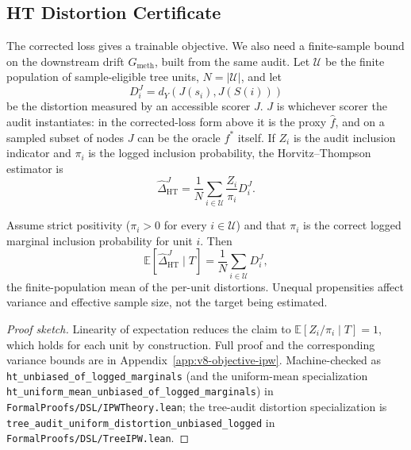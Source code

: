 \subsection{HT Distortion Certificate}

The corrected loss gives a trainable objective. We also need a
finite-sample bound on the downstream drift \(G_{\mathrm{meth}}\),
built from the same audit. Let \(\mathcal U\) be the finite
population of sample-eligible tree units, \(N=|\mathcal U|\),
and let
\[
  D_i^J
  =
  d_Y\!\left(J(s_i),J(S(i))\right)
\]
be the distortion measured by an accessible scorer \(J\). \(J\) is
whichever scorer the audit instantiates: in the corrected-loss form
above it is the proxy \(\widehat f\), and on a sampled subset of nodes
\(J\) can be the oracle \(f^\ast\) itself. If \(Z_i\) is the audit
inclusion indicator and \(\pi_i\) is the logged inclusion probability,
the Horvitz--Thompson estimator is
\begin{equation}
\label{eq:v8-ht-distortion}
  \widehat{\Delta}_{\mathrm{HT}}^{J}
  =
  \frac{1}{N}
  \sum_{i\in\mathcal U}
  \frac{Z_i}{\pi_i}D_i^J .
\end{equation}

\begin{proposition}
\label{prop:v10-ht-unbiased}
Assume strict positivity (\(\pi_i>0\) for every \(i\in\mathcal U\)) and
that \(\pi_i\) is the correct logged marginal inclusion probability
for unit \(i\). Then
\[
  \mathbb E\!\left[\widehat{\Delta}_{\mathrm{HT}}^{J}\mid T\right]
  =
  \frac{1}{N}\sum_{i\in\mathcal U}D_i^J ,
\]
the finite-population mean of the per-unit distortions. Unequal
propensities affect variance and effective sample size, not the
target being estimated.
\end{proposition}

\begin{proof}[Proof sketch]
Linearity of expectation reduces the claim to
\(\mathbb E[Z_i/\pi_i\mid T]=1\), which holds for each unit by
construction. Full proof and the corresponding variance bounds are in
Appendix~\ref{app:v8-objective-ipw}. Machine-checked as
\texttt{ht\_unbiased\_of\_logged\_marginals} (and the uniform-mean
specialization \texttt{ht\_uniform\_mean\_unbiased\_of\_logged\_marginals})
in \texttt{FormalProofs/DSL/IPWTheory.lean}; the tree-audit
distortion specialization is
\texttt{tree\_audit\_uniform\_distortion\_unbiased\_logged} in
\texttt{FormalProofs/DSL/TreeIPW.lean}.
\end{proof}

